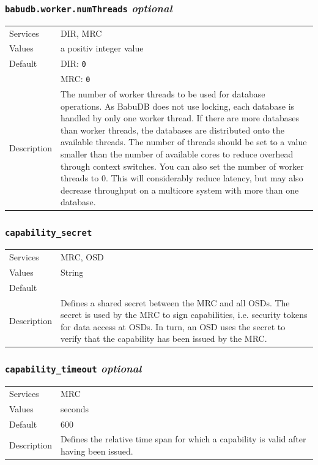 \documentclass[a4paper,10pt]{book}
\begin{document}
\subsubsection{\texttt{babudb.worker.numThreads} \textit{optional}}
\begin{tabular}{lp{10cm}}
 Services & DIR, MRC\\
 Values   & a positiv integer value\\
 Default  & DIR: \texttt{0}\\
          & MRC: \texttt{0}\\
 Description & The number of worker threads to be used for database operations. As BabuDB does not use locking, each database is handled by only one worker thread. If there are more databases than worker threads, the databases are distributed onto the available threads. The number of threads should be set to a value smaller than the number of available cores to reduce overhead through context switches. You can also set the number of worker threads to 0. This will considerably reduce latency, but may also decrease throughput on a multicore system with more than one database.
\end{tabular}

\subsubsection{\texttt{capability\_secret}}
\begin{tabular}{lp{10cm}}
 Services & MRC, OSD\\
 Values   & String \\
 Default  & \\
 Description & Defines a shared secret between the MRC and all OSDs. The secret is used by the MRC to sign capabilities, i.e. security tokens for data access at OSDs. In turn, an OSD uses the secret to verify that the capability has been issued by the MRC.
\end{tabular}

\subsubsection{\texttt{capability\_timeout} \textit{optional}}
\begin{tabular}{lp{10cm}}
 Services & MRC\\
 Values   & seconds\\
 Default  & 600\\
 Description & Defines the relative time span for which a capability is valid after having been issued.
\end{tabular}
\end{document}
